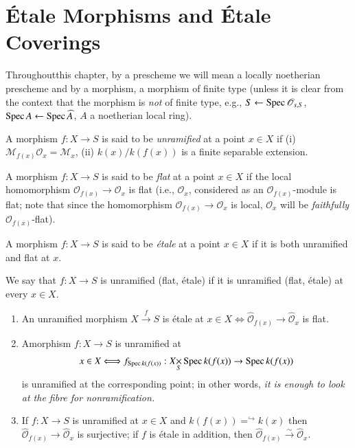 \chapter{\'Etale Morphisms and \'Etale Coverings}\label{chap3}

Throughout\pageoriginale this chapter, by a prescheme we will mean a
locally noetherian prescheme and by a morphism, a morphism of finite
type (unless it is clear from the context that the morphism is {\em
  not} of finite type, e.g., $S\leftarrow \operatorname{Spec} \mathscr{O}_{s,S}$,
$\operatorname{Spec} A\leftarrow \operatorname{Spec} \widehat{A}$, $A$ a noetherian local ring).

\setcounter{section}{1}
\setcounter{defin}{-1}
\begin{defin}\label{chap3-defi3.1.0}%
A morphism $f:X\to S$ is said to be {\em unramified} at a point $x\in
X$ if (i) $\mathscr{M}_{f(x)}\mathscr{O}_{x}=\mathscr{M}_{x}$, (ii)
$k(x)/k(f(x))$ is a finite separable extension.
\end{defin}

\begin{defin}\label{chap3-defi3.1.1}%
A morphism $f:X\to S$ is said to be {\em flat} at a point $x\in X$ if
the local homomorphism $\mathscr{O}_{f(x)}\to \mathscr{O}_{x}$ is flat
(i.e., $\mathscr{O}_{x}$, considered as an $\mathscr{O}_{f(x)}$-module
is flat; note that since the homomorphism $\mathscr{O}_{f(x)}\to
\mathscr{O}_{x}$ is local, $\mathscr{O}_{x}$ will be {\em faithfully}
$\mathscr{O}_{f(x)}$-flat). 
\end{defin}

\begin{defin}\label{chap3-defi3.1.2}%
A morphism $f:X\to S$ is said to be {\em \'etale} at a point $x\in X$
if it is both unramified and flat at $x$.
\end{defin}

We say that $f:X\to S$ is unramified (\resp flat, \'etale) if it is
unramified (\resp flat, \'etale) at every $x\in X$.

\setcounter{remarks}{2}
\begin{remarks}\label{chap3-rems3.1.3}
\begin{enumerate}
\renewcommand{\labelenumi}{(\theenumi)}
\item An unramified morphism $X\xrightarrow{f}S$ is \'etale at $x\in
  X\Leftrightarrow \widehat{\mathscr{O}}_{f(x)}\to
  \widehat{\mathscr{O}}_{x}$ is flat. 

\item A\pageoriginale morphism $f:X\to S$ is unramified at
$$
x\in X\Longleftrightarrow f_{\Spec
  k(f(x))}:\fprod{X}{\Spec}{S}k(f(x))\to \Spec k(f(x))
$$
is unramified at the corresponding point; in other words, {\em it is
  enough to look at the fibre for nonramification.}

\item If $f:X\to S$ is unramified at $x\in X$ and
  $k(f(x)){\displaystyle\mathop{=}^{\hookrightarrow}} k(x)$ then
  $\widehat{\mathscr{O}}_{f(x)}\to \widehat{\mathscr{O}}_{x}$ is
  surjective; if $f$ is \'etale in addition, then
  $\widehat{\mathscr{O}}_{f(x)}\xrightarrow{\sim}\widehat{\mathscr{O}}_{x}$. 
\end{enumerate}
\end{remarks}


